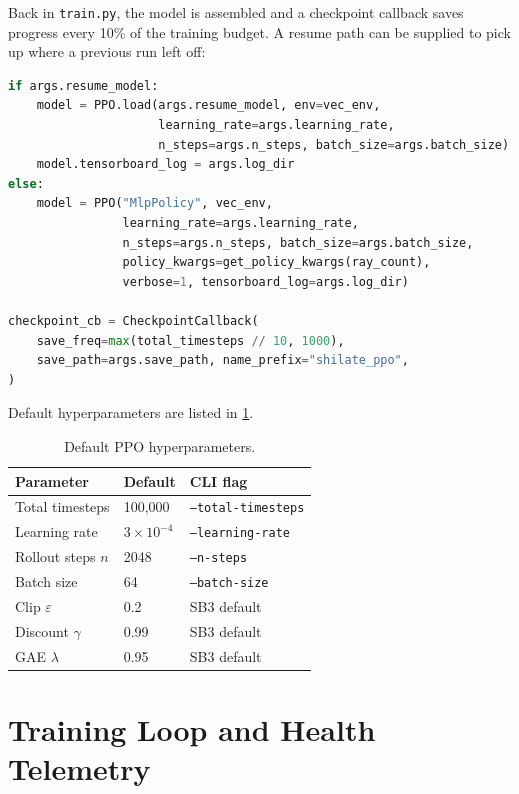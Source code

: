 Back in \texttt{train.py}, the model is assembled and a checkpoint
callback saves progress every 10\% of the training budget. A resume path
can be supplied to pick up where a previous run left off:

\begin{lstlisting}[language=Python,
  caption={PPO model creation and checkpoint setup from train.py.},
  label={code:pposetup}]
if args.resume_model:
    model = PPO.load(args.resume_model, env=vec_env,
                     learning_rate=args.learning_rate,
                     n_steps=args.n_steps, batch_size=args.batch_size)
    model.tensorboard_log = args.log_dir
else:
    model = PPO("MlpPolicy", vec_env,
                learning_rate=args.learning_rate,
                n_steps=args.n_steps, batch_size=args.batch_size,
                policy_kwargs=get_policy_kwargs(ray_count),
                verbose=1, tensorboard_log=args.log_dir)

checkpoint_cb = CheckpointCallback(
    save_freq=max(total_timesteps // 10, 1000),
    save_path=args.save_path, name_prefix="shilate_ppo",
)
\end{lstlisting}

Default hyperparameters are listed in \cref{table:ppo-params}.

\begin{table}[H]
\caption{Default PPO hyperparameters.}
\label{table:ppo-params}
\begin{tabular}{|p{5cm}|p{3cm}|p{4cm}|}
  \hline
  \textbf{Parameter} & \textbf{Default} & \textbf{CLI flag} \\
  \hline
  Total timesteps      & 100{,}000          & \texttt{--total-timesteps} \\
  \hline
  Learning rate        & $3 \times 10^{-4}$ & \texttt{--learning-rate} \\
  \hline
  Rollout steps $n$    & 2048               & \texttt{--n-steps} \\
  \hline
  Batch size           & 64                 & \texttt{--batch-size} \\
  \hline
  Clip $\varepsilon$   & 0.2                & SB3 default \\
  \hline
  Discount $\gamma$    & 0.99               & SB3 default \\
  \hline
  GAE $\lambda$        & 0.95               & SB3 default \\
  \hline
\end{tabular}
\end{table}

\section{Training Loop and Health Telemetry}
\label{sec:training-loop}


